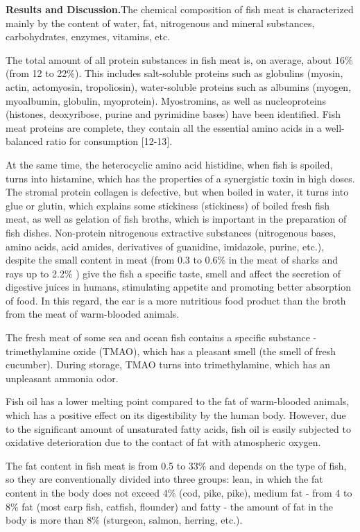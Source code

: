 \begin{multicols}{2}
{\bfseries Results and Discussion.}The chemical composition of fish meat is
characterized mainly by the content of water, fat, nitrogenous and
mineral substances, carbohydrates, enzymes, vitamins, etc.

The total amount of all protein substances in fish meat is, on average,
about 16\% (from 12 to 22\%). This includes salt-soluble proteins such
as globulins (myosin, actin, actomyosin, tropoliosin), water-soluble
proteins such as albumins (myogen, myoalbumin, globulin, myoprotein).
Myostromins, as well as nucleoproteins (histones, deoxyribose, purine
and pyrimidine bases) have been identified. Fish meat proteins are
complete, they contain all the essential amino acids in a well-balanced
ratio for consumption {[}12-13{]}.

At the same time, the heterocyclic amino acid histidine, when fish is
spoiled, turns into histamine, which has the properties of a synergistic
toxin in high doses. The stromal protein collagen is defective, but when
boiled in water, it turns into glue or glutin, which explains some
stickiness (stickiness) of boiled fresh fish meat, as well as gelation
of fish broths, which is important in the preparation of fish dishes.
Non-protein nitrogenous extractive substances (nitrogenous bases, amino
acids, acid amides, derivatives of guanidine, imidazole, purine, etc.),
despite the small content in meat (from 0.3 to 0.6\% in the meat of
sharks and rays up to 2.2\% ) give the fish a specific taste, smell and
affect the secretion of digestive juices in humans, stimulating appetite
and promoting better absorption of food. In this regard, the ear is a
more nutritious food product than the broth from the meat of
warm-blooded animals.

The fresh meat of some sea and ocean fish contains a specific substance
- trimethylamine oxide (TMAO), which has a pleasant smell (the smell of
fresh cucumber). During storage, TMAO turns into trimethylamine, which
has an unpleasant ammonia odor.

Fish oil has a lower melting point compared to the fat of warm-blooded
animals, which has a positive effect on its digestibility by the human
body. However, due to the significant amount of unsaturated fatty acids,
fish oil is easily subjected to oxidative deterioration due to the
contact of fat with atmospheric oxygen.

The fat content in fish meat is from 0.5 to 33\% and depends on the type
of fish, so they are conventionally divided into three groups: lean, in
which the fat content in the body does not exceed 4\% (cod, pike, pike),
medium fat - from 4 to 8\% fat (most carp fish, catfish, flounder) and
fatty - the amount of fat in the body is more than 8\% (sturgeon,
salmon, herring, etc.).


\end{multicols}

